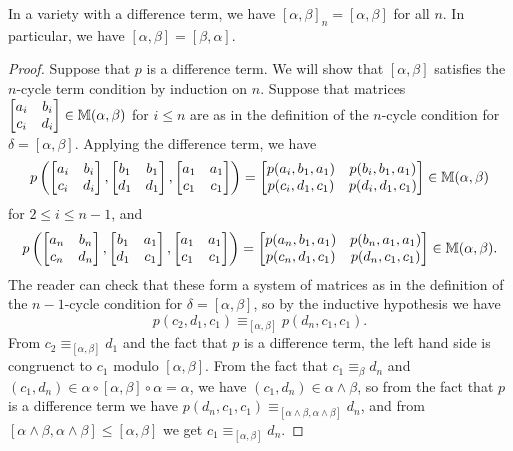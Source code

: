 \documentclass[letterpaper,11pt]{article}
\begin{document}
\begin{thm} In a variety with a difference term, we have $[\alpha,\beta]_n = [\alpha,\beta]$ for all $n$. In particular, we have $[\alpha,\beta] = [\beta,\alpha]$.
\end{thm}
\begin{proof} Suppose that $p$ is a difference term. We will show that $[\alpha,\beta]$ satisfies the $n$-cycle term condition by induction on $n$. Suppose that matrices $\begin{bmatrix} a_i & b_i\\ c_i & d_i\end{bmatrix} \in \mathbb{M}(\alpha,\beta)$ for $i \le n$ are as in the definition of the $n$-cycle condition for $\delta = [\alpha,\beta]$. Applying the difference term, we have
\[
p\left(\begin{bmatrix} a_i & b_i\\ c_i & d_i\end{bmatrix}, \begin{bmatrix} b_1 & b_1\\ d_1 & d_1\end{bmatrix}, \begin{bmatrix} a_1 & a_1\\ c_1 & c_1\end{bmatrix}\right) = \begin{bmatrix} p(a_i,b_1,a_1) & p(b_i, b_1, a_1)\\ p(c_i, d_1, c_1) & p(d_i, d_1, c_1)\end{bmatrix} \in \mathbb{M}(\alpha,\beta)
\]
for $2 \le i \le n-1$, and
\[
p\left(\begin{bmatrix} a_n & b_n\\ c_n & d_n\end{bmatrix}, \begin{bmatrix} b_1 & a_1\\ d_1 & c_1\end{bmatrix}, \begin{bmatrix} a_1 & a_1\\ c_1 & c_1\end{bmatrix}\right) = \begin{bmatrix} p(a_n,b_1,a_1) & p(b_n, a_1, a_1)\\ p(c_n, d_1, c_1) & p(d_n, c_1, c_1)\end{bmatrix} \in \mathbb{M}(\alpha,\beta).
\]
The reader can check that these form a system of matrices as in the definition of the $n-1$-cycle condition for $\delta = [\alpha,\beta]$, so by the inductive hypothesis we have
\[
p(c_2,d_1,c_1) \equiv_{[\alpha,\beta]} p(d_n,c_1,c_1).
\]
From $c_2 \equiv_{[\alpha,\beta]} d_1$ and the fact that $p$ is a difference term, the left hand side is congruenct to $c_1$ modulo $[\alpha,\beta]$. From the fact that $c_1 \equiv_{\beta} d_n$ and $(c_1,d_n) \in \alpha \circ [\alpha,\beta] \circ \alpha = \alpha$, we have $(c_1,d_n) \in \alpha \wedge \beta$, so from the fact that $p$ is a difference term we have $p(d_n,c_1,c_1) \equiv_{[\alpha\wedge\beta,\alpha\wedge\beta]} d_n$, and from $[\alpha\wedge\beta,\alpha\wedge\beta] \le [\alpha,\beta]$ we get $c_1 \equiv_{[\alpha,\beta]} d_n$.
\end{proof}
\end{document}
